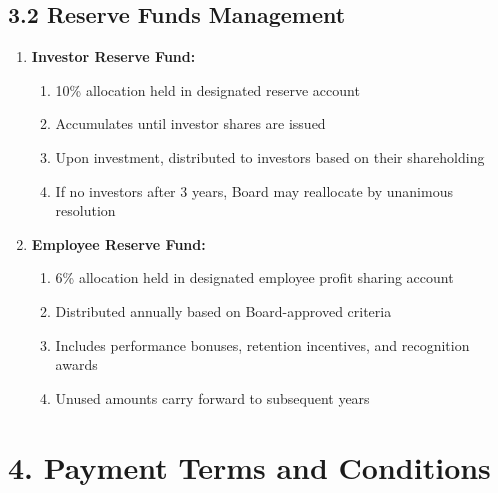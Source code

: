 \subsection*{3.2 Reserve Funds Management}
\begin{enumerate}[label=\arabic*.]
\item \textbf{Investor Reserve Fund:}
    \begin{enumerate}[label=(\alph*)]
    \item 10\% allocation held in designated reserve account
    \item Accumulates until investor shares are issued
    \item Upon investment, distributed to investors based on their shareholding
    \item If no investors after 3 years, Board may reallocate by unanimous resolution
    \end{enumerate}

\item \textbf{Employee Reserve Fund:}
    \begin{enumerate}[label=(\alph*)]
    \item 6\% allocation held in designated employee profit sharing account
    \item Distributed annually based on Board-approved criteria
    \item Includes performance bonuses, retention incentives, and recognition awards
    \item Unused amounts carry forward to subsequent years
    \end{enumerate}
\end{enumerate}

\section*{4. Payment Terms and Conditions}

